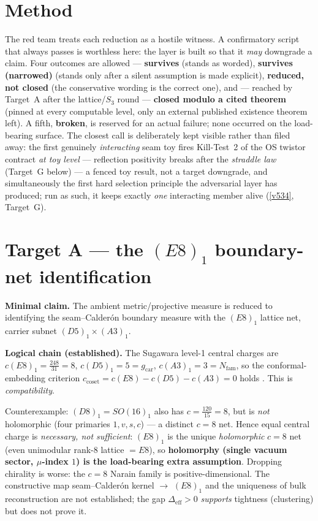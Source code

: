 \documentclass[11pt,a4paper]{article}
\newcommand{\Nfam}{N_{\mathrm{fam}}}
\newcommand{\gcar}{g_{\mathrm{car}}}
\begin{document}
\section*{Method}
The red team treats each reduction as a hostile witness. A confirmatory script that always passes
is worthless here: the layer is built so that it \emph{may} downgrade a claim. Four outcomes are
allowed --- \textbf{survives} (stands as worded), \textbf{survives (narrowed)} (stands only after a
silent assumption is made explicit), \textbf{reduced, not closed} (the conservative wording is
the correct one), and --- reached by Target~A after the lattice/$S_3$ round --- \textbf{closed modulo a cited
theorem} (pinned at every computable level, only an external published existence theorem left). A fifth,
\textbf{broken}, is reserved for an actual failure; none occurred on the load-bearing surface. The
closest call is deliberately kept visible rather than filed away: the first genuinely
\emph{interacting} seam toy fires Kill-Test~2 of the OS twistor contract \emph{at toy level} ---
reflection positivity breaks after the \emph{straddle law} (Target~G below) --- a fenced toy result,
not a target downgrade, and simultaneously the first hard selection principle the adversarial layer
has produced; run as such, it keeps exactly \emph{one} interacting member alive
(\vref{v534}, Target~G).

\section*{Target A --- the $(E8)_1$ boundary-net identification}\label{sec:A}
\noindent\textbf{Minimal claim.} The ambient metric/projective measure is reduced to identifying the
seam--Calder\'on boundary measure with the $(E8)_1$ lattice net, carrier subnet
$(D5)_1\times(A3)_1$.

\smallskip\noindent\textbf{Logical chain (established).} The Sugawara level-1 central charges are
$c(E8)_1=\tfrac{248}{31}=8$, $c(D5)_1=5=\gcar$, $c(A3)_1=3=\Nfam$, so the conformal-embedding
criterion $c_{\mathrm{coset}}=c(E8)-c(D5)-c(A3)=0$ holds \mE. This is \emph{compatibility}.

\begin{gapbox}
Counterexample: $(D8)_1=SO(16)_1$ also has $c=\tfrac{120}{15}=8$, but is \emph{not} holomorphic
(four primaries $1,v,s,c$) --- a distinct $c=8$ net. Hence equal central charge is \emph{necessary,
not sufficient}: $(E8)_1$ is the unique \emph{holomorphic} $c=8$ net (even unimodular rank-8
lattice $=E8$), so \textbf{holomorphy (single vacuum sector, $\mu$-index $1$) is the load-bearing
extra assumption}. Dropping chirality is worse: the $c=8$ Narain family is positive-dimensional.
The constructive map seam--Calder\'on kernel $\to$ $(E8)_1$ and the uniqueness of bulk
reconstruction are not established; the gap $\Delta_{\mathrm{eff}}>0$ \emph{supports} tightness
(clustering) but does not prove it.
\end{gapbox}
\end{document}
